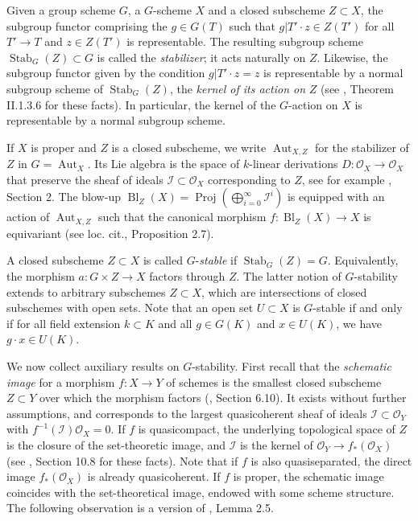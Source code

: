 \documentclass[oneside, 12pt]{amsart}
\theoremstyle{definition}
\theoremstyle{remark}
\newcommand{\shI}{\mathscr{I}}
\newcommand{\Aut}{\operatorname{Aut}}
\newcommand{\Bl}{\operatorname{Bl}}
\renewcommand{\O}{\mathscr{O}}
\newcommand{\Proj}{\operatorname{Proj}}
\newcommand{\ra}{\rightarrow}
\newcommand{\Stab}{\operatorname{Stab}}
\begin{document}
Given a group scheme $G$, a $G$-scheme $X$ and a closed subscheme 
$Z\subset X$, the subgroup functor comprising the $g\in G(T)$ 
such that $g|{T'} \cdot z\in Z(T')$
for all $T'\ra T$ and $z \in Z(T')$ is representable. 
The resulting subgroup scheme $\Stab_G(Z)\subset G$ is called 
the \emph{stabilizer}; it acts naturally on $Z$.
Likewise, the subgroup functor given by the condition $g|T'\cdot z=z$ 
is representable by a normal subgroup scheme of 
$\Stab_G(Z)$,  the \emph{kernel of its action on} $Z$
(see \cite{Demazure; Gabriel 1970}, Theorem II.1.3.6 for these facts).  In particular,  the kernel of the $G$-action on $X$ is
representable by a normal subgroup scheme.

If $X$ is proper and $Z$ is a closed subscheme, 
we write $\Aut_{X,Z}$ for the stabilizer of $Z$ in $G=\Aut_X$. 
Its Lie algebra is  the space of $k$-linear derivations $D:\O_X\ra \O_X$ 
that preserve the sheaf of ideals $\shI\subset\O_X$ corresponding to $Z$, see 
for example \cite{Martin 2022}, Section 2. The blow-up 
$\Bl_Z(X) = \Proj(\bigoplus_{i =0}^{\infty} \shI^i)$ is equipped with an action 
of $\Aut_{X,Z}$ such that the canonical morphism $f : \Bl_Z(X) \to X$ 
is equivariant (see loc. cit., Proposition 2.7).

A closed subscheme $Z\subset X$ is called $G$-\emph{stable}
if $\Stab_G(Z) = G$. Equivalently,
the morphism $a : G \times Z \to X$  factors through $Z$.
The latter notion of $G$-stability extends to 
arbitrary subschemes $Z\subset X$, which are intersections of closed subschemes with open sets.
Note that an  open set $U\subset X$ is
$G$-stable if and only if for all field
extension $k\subset K$ and  all $g \in G(K)$ and $x \in U(K)$,
we have $g \cdot x \in U(K)$.
 
We now collect auxiliary results on $G$-stability.
First recall that the \emph{schematic image} for a morphism   $f:X\ra Y$ of schemes
is the smallest closed subscheme $Z\subset Y$ over which the morphism factors  
(\cite{EGA I}, Section 6.10).
It   exists without further assumptions, 
and  corresponds to the largest quasicoherent sheaf of ideals $\shI\subset\O_Y$ with $f^{-1}(\shI)\O_X=0$.
If $f$ is quasicompact, the underlying topological space of $Z$
is the closure of the set-theoretic image, and $\shI$ is the kernel of $\O_Y\ra f_*(\O_X)$
(see \cite{Goertz; Wedhorn 2010}, Section 10.8 for these facts).
Note that if $f$ is also quasiseparated,  the direct image $f_*(\O_X)$ is already quasicoherent.
If $f$ is proper, the schematic image coincides with the set-theoretical image,  endowed with some scheme structure.
The following observation is a version of \cite{Martin 2022}, Lemma 2.5.
\end{document}
